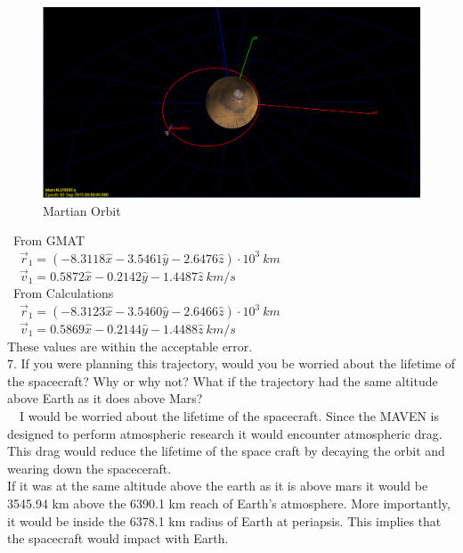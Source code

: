 \documentclass[hidelinks,12pt]{article}
\begin{document}
\begin{figure}[!htb]
  \center
  \includegraphics[scale=0.6]{HW5}
  \caption{Martian Orbit}
  \label{}
\end{figure}
\newpage
~From GMAT\\
~~$\vec{r}_1 = (-8.3118 \hat{x} - 3.5461 \hat{y} -2.6476 \hat{z}) \cdot 10^3~km$\\
~~$\vec{v}_1 = 0.5872 \hat{x} -0.2142 \hat{y} -1.4487 \hat{z}~km/s$\\
~From Calculations\\
~~$\vec{r}_1 = (-8.3123 \hat{x} - 3.5460 \hat{y} -2.6466 \hat{z}) \cdot 10^3~km$\\
~~$\vec{v}_1 = 0.5869 \hat{x} -0.2144 \hat{y} -1.4488 \hat{z}~km/s$\\
These values are within the acceptable error.\\
\vspace{5px}
7. If you were planning this trajectory, would you be worried about the lifetime of the spacecraft? Why or why not? What if the trajectory had the same altitude above Earth as it does above Mars?\\
~~I would be worried about the lifetime of the spacecraft. Since the MAVEN is designed to perform atmospheric research it would encounter atmospheric drag. This drag would reduce the lifetime of the space craft by decaying the orbit and wearing down the spaceceraft.\\
If it was at the same altitude above the earth as it is above mars it would be 3545.94 km above the 6390.1 km reach of Earth's atmosphere. More importantly, it would be inside the 6378.1 km radius of Earth at periapsis. This implies that the spacecraft would impact with Earth.

\newpage

\end{document}
